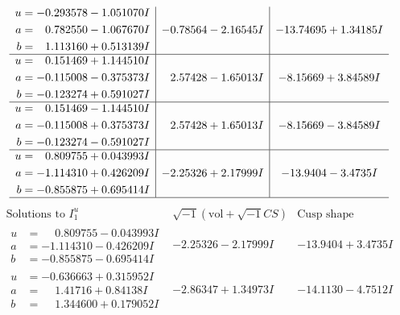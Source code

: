 \documentclass[1p]{elsarticle_modified}
\theoremstyle{definition}
\newcommand{\I}{\sqrt{-1}}
\begin{document}
$$\begin{array}{c|c|c}
\begin{aligned}
u &= -0.293578 - 1.051070 I \\
a &= \phantom{-}0.782550 - 1.067670 I \\
b &= \phantom{-}1.113160 + 0.513139 I\end{aligned}
 & -0.78564 - 2.16545 I & -13.74695 + 1.34185 I \\ \hline\begin{aligned}
u &= \phantom{-}0.151469 + 1.144510 I \\
a &= -0.115008 - 0.375373 I \\
b &= -0.123274 + 0.591027 I\end{aligned}
 & \phantom{-}2.57428 - 1.65013 I & -8.15669 + 3.84589 I \\ \hline\begin{aligned}
u &= \phantom{-}0.151469 - 1.144510 I \\
a &= -0.115008 + 0.375373 I \\
b &= -0.123274 - 0.591027 I\end{aligned}
 & \phantom{-}2.57428 + 1.65013 I & -8.15669 - 3.84589 I \\ \hline\begin{aligned}
u &= \phantom{-}0.809755 + 0.043993 I \\
a &= -1.114310 + 0.426209 I \\
b &= -0.855875 + 0.695414 I\end{aligned}
 & -2.25326 + 2.17999 I & -13.9404 - 3.4735 I\\
 \hline 
 \end{array}$$\newpage$$\begin{array}{c|c|c}  
\text{Solutions to }I^u_{1}& \I (\text{vol} + \sqrt{-1}CS) & \text{Cusp shape}\\
 \hline 
\begin{aligned}
u &= \phantom{-}0.809755 - 0.043993 I \\
a &= -1.114310 - 0.426209 I \\
b &= -0.855875 - 0.695414 I\end{aligned}
 & -2.25326 - 2.17999 I & -13.9404 + 3.4735 I \\ \hline\begin{aligned}
u &= -0.636663 + 0.315952 I \\
a &= \phantom{-}1.41716 + 0.84138 I \\
b &= \phantom{-}1.344600 + 0.179052 I\end{aligned}
 & -2.86347 + 1.34973 I & -14.1130 - 4.7512 I \\ \hline\begin{aligned}

\end{aligned}
\end{array}$$
\end{document}
